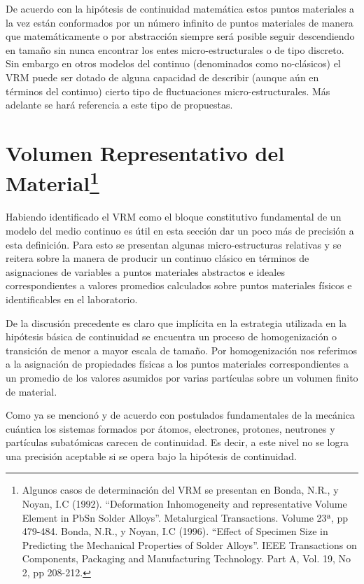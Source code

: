 \documentclass[../notas medios.tex]{subfiles}
\begin{document}
De acuerdo con la hipótesis de continuidad matemática estos puntos materiales a la vez están conformados por un número infinito de puntos materiales de manera que matemáticamente o por abstracción siempre será posible seguir descendiendo en tamaño sin nunca encontrar los entes micro-estructurales o de tipo discreto.  Sin embargo en otros modelos del continuo (denominados como no-clásicos) el VRM puede ser dotado de alguna capacidad de describir (aunque aún en términos del continuo) cierto tipo de fluctuaciones micro-estructurales.  Más adelante se hará referencia a este tipo de propuestas.

\section*{Volumen Representativo del Material\footnote{Algunos casos de determinación del VRM se presentan en Bonda, N.R., y Noyan, I.C (1992).  “Deformation Inhomogeneity and representative Volume Element in Pb\/Sn Solder Alloys”.  Metalurgical Transactions.  Volume 23ª, pp 479-484.  Bonda, N.R., y Noyan, I.C (1996).  “Effect of Specimen Size in Predicting the Mechanical Properties of Solder Alloys”.  IEEE Transactions on Components, Packaging and Manufacturing Technology.  Part A, Vol. 19, No 2, pp 208-212.}}

Habiendo identificado el VRM como el bloque constitutivo fundamental de un
modelo del medio continuo es útil en esta sección dar un poco más de precisión
a esta definición.  Para esto se presentan algunas micro-estructuras relativas y se reitera sobre la manera de producir un continuo clásico en términos de asignaciones de variables a puntos materiales abstractos e ideales correspondientes a valores promedios calculados sobre puntos materiales físicos e identificables en el laboratorio.

De la discusión precedente es claro que implícita en la estrategia utilizada en la hipótesis básica de continuidad se encuentra un proceso de homogenización o transición de menor a mayor escala de tamaño.  Por homogenización nos referimos a la asignación de propiedades físicas a los puntos materiales correspondientes a un promedio de los valores asumidos por varias partículas sobre un volumen finito de material.

Como ya se mencionó y de acuerdo con postulados fundamentales de la mecánica cuántica los sistemas formados por átomos, electrones, protones, neutrones y partículas subatómicas carecen de continuidad.  Es decir, a este nivel no se logra una precisión aceptable si se opera bajo la hipótesis de continuidad.
\end{document}
